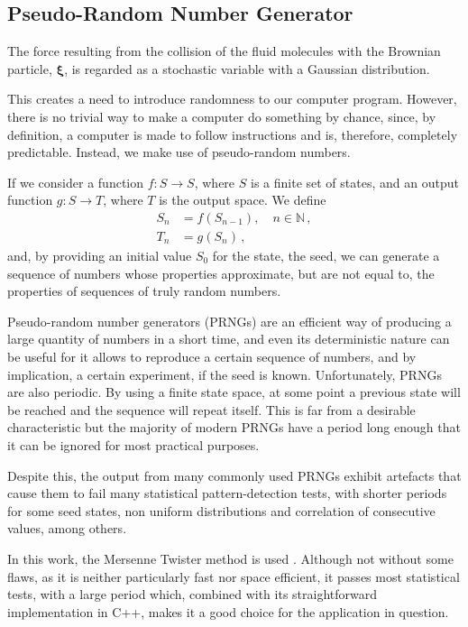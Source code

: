\documentclass[../../main.tex]{subfiles}
\begin{document}
\begin{appendices}
\chapter{Pseudo-Random Number Generator}\label{app: RNG}
    The force resulting from the collision of the fluid molecules with the Brownian particle, $\bm{\xi}$, is regarded as a stochastic variable with a Gaussian distribution.
    
    This creates a need to introduce randomness to our computer program. However, there is no trivial way to make a computer do something by chance, since, by definition, a computer is made to follow instructions and is, therefore, completely predictable. Instead, we make use of pseudo-random numbers.
    
    If we consider a function $f: S \rightarrow S$, where $S$ is a finite set of states, and an output function $g: S \rightarrow T$, where $T$ is the output space. We define
        \begin{equation}
            \begin{split}
                S_n &= f(S_{n-1}), \quad n \in \mathbb{N} \,,\\
                T_n &= g(S_n) \,,
            \end{split}
        \end{equation}
    and, by providing an initial value $S_0$ for the state, the seed, we can generate a sequence of numbers whose properties approximate, but are not equal to, the properties of sequences of truly random numbers.
    
    Pseudo-random number generators (PRNGs) are an efficient way of producing a large quantity of numbers in a short time, and even its deterministic nature can be useful for it allows to reproduce a certain sequence of numbers, and by implication, a certain experiment, if the seed is known. Unfortunately, PRNGs are also periodic. By using a finite state space, at some point a previous state will be reached and the sequence will repeat itself. This is far from a desirable characteristic but the majority of modern PRNGs have a period long enough that it can be ignored for most practical purposes.
    
    Despite this, the output from many commonly used PRNGs exhibit artefacts that cause them to fail many statistical pattern-detection tests, with shorter periods for some seed states, non uniform distributions and correlation of consecutive values, among others.
    
    In this work, the Mersenne Twister method is used \cite{matsumotoMersenneTwister623dimensionally1998}. Although not without some flaws, as it is neither particularly fast nor space efficient, it passes most statistical tests, with a large period which, combined with its straightforward implementation in C++, makes it a good choice for the application in question.


\end{appendices}
\end{document}
